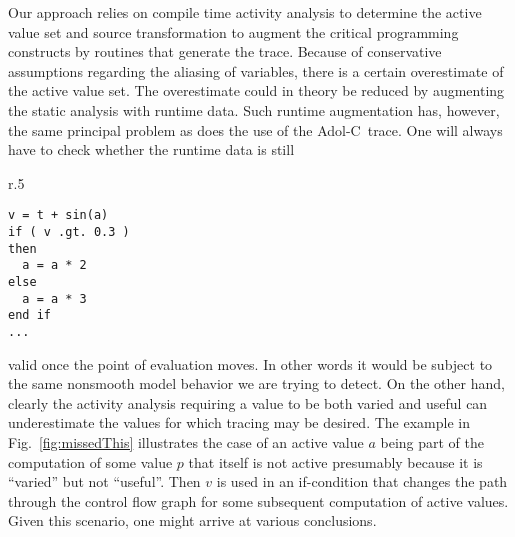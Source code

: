 \documentclass{article}
\newcommand{\adolc}{\mbox{Adol-C}}
\newcommand{\reffig}[1]{{Fig.~\ref{#1}}}
\begin{document}
Our approach relies on compile time activity analysis to determine the active value set 
and source transformation to augment the critical programming constructs by 
routines that generate the trace. 
Because of conservative assumptions regarding the 
aliasing of variables, there is a certain overestimate of the active value set. 
The overestimate could in theory be reduced by augmenting the static analysis 
with runtime data. 
Such runtime augmentation has,  however,  the same principal problem as does the use
of the \adolc\  trace. 
One will always have to check 
whether the runtime data is still  
\begin{wrapfigure}[13]{r}{.5\textwidth}
\begin{minipage}{.95\linewidth}
\begin{lstlisting}[frame=single]
v = t + sin(a) 
if ( v .gt. 0.3 )
then 
  a = a * 2
else
  a = a * 3
end if 
...
\end{lstlisting}
\end{minipage}
\caption{A control flow decision depending on a nonactive variable}\label{fig:missedThis} 
\end{wrapfigure}
valid once the point of evaluation moves. 
In other words it would be subject to the same nonsmooth model behavior we are trying to detect.
On the other hand, clearly the activity  analysis requiring a value 
to be both varied and useful can underestimate 
the values for which tracing may be desired.
The example in \reffig{fig:missedThis} illustrates the case of an active value  $a$
being part of the computation of some value $p$ that itself is not active presumably 
because it is ``varied'' but not ``useful''.
Then $v$ is used in an if-condition that changes the path through the control flow 
graph for some  subsequent computation of active values.
Given this scenario, one might arrive at various conclusions. 
\end{document}
